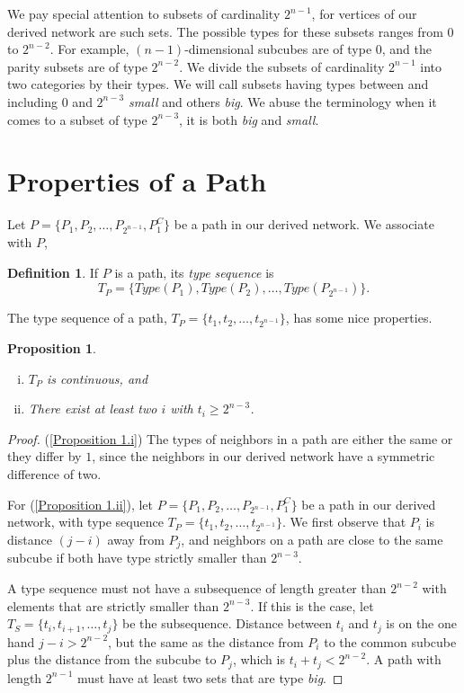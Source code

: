 \documentclass[12pt]{ucthesis}
\theoremstyle{plain}
\newtheorem{proposition}{Proposition}
\theoremstyle{definition}
\newtheorem{definition}{Definition}
\begin{document}
We pay special attention to subsets of cardinality $2^{n - 1}$,
for vertices of our derived network are such sets.
The possible types for these subsets ranges from $0$ to $2^{n - 2}$.
For example, $(n - 1)$-dimensional subcubes are of type $0$,
and the parity subsets are of type $2^{n - 2}$.
We divide the subsets of cardinality $2^{n - 1}$ into two categories by their types.
We will call subsets having types between and including $0$ and $2^{n - 3}$ \emph{small} and others \emph{big}.
We abuse the terminology when it comes to a subset of type $2^{n - 3}$,
it is both \emph{big} and \emph{small}.

\section{Properties of a Path}
\label{Section 2.5}

Let $P = \{P_1, P_2, \dots, P_{2^{n - 1}}, P_1^C\}$ be a path in our derived network.
We associate with $P$,
\begin{definition}
\label{Definition 6}
If $P$ is a path, its \emph{type sequence} is
\begin{equation*}
T_P = \{Type(P_1), Type(P_2), \dots, Type(P_{2^{n - 1}})\}.
\end{equation*}
\end{definition}

The type sequence of a path, $T_P = \{t_1, t_2, \dots, t_{2^{n - 1}}\}$,
has some nice properties.
\begin{proposition}
\label{Proposition 1}
\hfill
\begin{enumerate}[(i)]
	\item\label{Proposition 1.i} $T_P$ is continuous, and
	\item\label{Proposition 1.ii} There exist at least two $i$ with $t_i \ge 2^{n - 3}$.
\end{enumerate}
\end{proposition}
\begin{proof}
(\ref{Proposition 1.i}) The types of neighbors in a path are either the same
or they differ by $1$,
since the neighbors in our derived network have a symmetric difference of two.

For (\ref{Proposition 1.ii}),
let $P = \{P_1, P_2, \dots, P_{2^{n - 1}}, P_1^C\}$ be a path in our derived network,
with type sequence $T_P = \{t_1, t_2, \dots, t_{2^{n - 1}}\}$.
We first observe that $P_i$ is distance $(j - i)$ away from $P_j$,
and neighbors on a path are close to the same subcube if both have type strictly smaller than $2^{n - 3}$.

A type sequence must not have a subsequence of length greater than $2^{n - 2}$
with elements that are strictly smaller than $2^{n - 3}$.
If this is the case,
let $T_S = \{t_i, t_{i + 1}, \dots, t_j\}$ be the subsequence.
Distance between $t_i$ and $t_j$ is on the one hand $j - i > 2^{n - 2}$,
but the same as the distance from $P_i$ to the common subcube
plus the distance from the subcube to $P_j$,
which is $t_i + t_j < 2^{n - 2}$.
A path with length $2^{n - 1}$ must have at least two sets that are type \emph{big}.
\end{proof}
\end{document}
